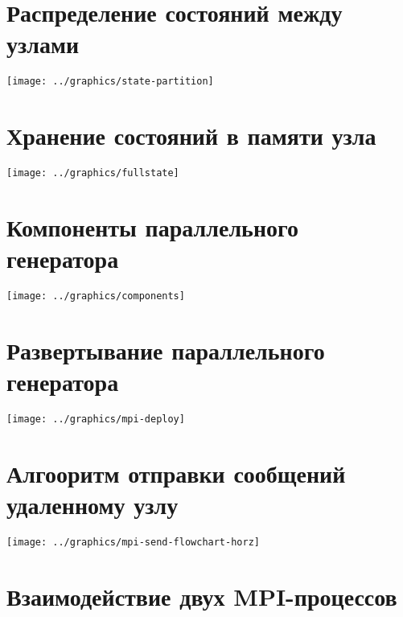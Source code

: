 \documentclass[12pt]{article}
\begin{document}
\section{Распределение состояний между узлами}
\label{sec:state-partitioning}

\begin{center}
  \texttt{[image: ../graphics/state-partition]}
\end{center}

\section{Хранение состояний в памяти узла}
\label{sec:state-store-full}

\begin{center}
  \texttt{[image: ../graphics/fullstate]}
\end{center}

\section{Компоненты параллельного генератора}
\label{sec:component-diag}

\begin{center}
  \texttt{[image: ../graphics/components]}
\end{center}

\section{Развертывание параллельного генератора}
\label{sec:deployment-diag}

\begin{center}
    \texttt{[image: ../graphics/mpi-deploy]}
\end{center}

\section{Алгооритм отправки сообщений удаленному узлу}
\label{sec:mpi-send-flowchart}

\begin{center}
  \texttt{[image: ../graphics/mpi-send-flowchart-horz]}
\end{center}

\section{Взаимодействие двух MPI-процессов}
\label{sec:mpi-sequence}
\end{document}
